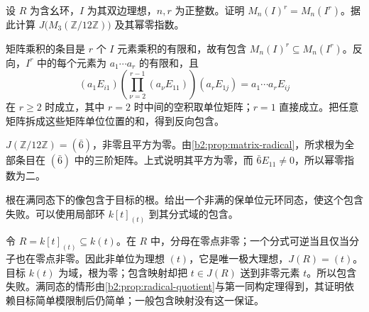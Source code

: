 \begin{exercise}\label{b2:ex:14-matrix-root-powers}
	设 \(R\) 为含幺环，\(I\) 为其双边理想，\(n,r\) 为正整数。证明 \(M_n(I)^r=M_n(I^r)\)。据此计算 \(J\bigl(M_3(\mathbb Z/12\mathbb Z)\bigr)\) 及其幂零指数。
\end{exercise}
\begin{solution}
	矩阵乘积的条目是 \(r\) 个 \(I\) 元素乘积的有限和，故有包含 \(M_n(I)^r\subseteq M_n(I^r)\)。反向，\(I^r\) 中的每个元素为 \(a_1\cdots a_r\) 的有限和，且
	\[
		(a_1E_{i1})\left(\prod_{\nu=2}^{r-1}(a_\nu E_{11})\right)(a_rE_{1j}) =a_1\cdots a_r E_{ij}
	\]
	在 \(r\ge2\) 时成立，其中 \(r=2\) 时中间的空积取单位矩阵；\(r=1\) 直接成立。把任意矩阵拆成这些矩阵单位位置的和，得到反向包含。

	\(J(\mathbb Z/12\mathbb Z)=(\bar6)\)，非零且平方为零。由\cref{b2:prop:matrix-radical}，所求根为全部条目在 \((\bar6)\) 中的三阶矩阵。上式说明其平方为零，而 \(\bar6E_{11}\ne0\)，所以幂零指数为二。
\end{solution}

\begin{exercise}\label{b2:ex:14-radical-general-map}
	根在满同态下的像包含于目标的根。给出一个非满的保单位元环同态，使这个包含失败。可以使用局部环 \(k[t]_{(t)}\) 到其分式域的包含。
\end{exercise}
\begin{solution}
	令 \(R=k[t]_{(t)}\subseteq k(t)\)。在 \(R\) 中，分母在零点非零；一个分式可逆当且仅当分子也在零点非零。因此非单位为理想 \((t)\)，它是唯一极大理想，\(J(R)=(t)\)。目标 \(k(t)\) 为域，根为零；包含映射却把 \(t\in J(R)\) 送到非零元素 \(t\)。所以包含失败。满同态的情形由\cref{b2:prop:radical-quotient}与第一同构定理得到，其证明依赖目标简单模限制后仍简单；一般包含映射没有这一保证。
\end{solution}

